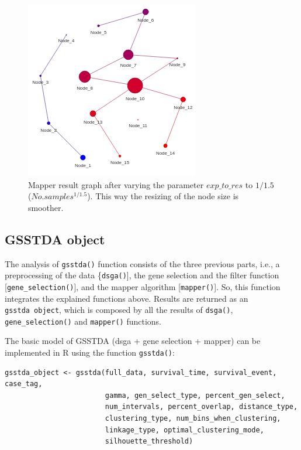 \begin{figure}
\includegraphics[width=0.65\linewidth,height=0.3\textheight]{Figures/plot_mapper_object_1_5} \caption{Mapper result graph after varying the parameter $exp\_to\_res$ to $1/1.5$ ($No. samples^{1/1.5}$). This way the resizing of the node size is smoother.}\label{fig:fig3}
\end{figure}

\hypertarget{section4.4}{%
\subsection{GSSTDA object}\label{section4.4}}

The analysis of \texttt{gsstda()} function consists of the three previous parts, i.e., a preprocessing of the data \{\texttt{dsga()}{]}, the gene selection and the filter function {[}\texttt{gene\_selection()}{]}, and the mapper algorithm {[}\texttt{mapper()}{]}. So, this function integrates the explained functions above. Results are returned as an \texttt{gsstda\ object}, which is composed by all the results of \texttt{dsga()}, \texttt{gene\_selection()} and \texttt{mapper()} functions.

The basic model of GSSTDA (dsga + gene selection + mapper) can be implemented in R using the function \texttt{gsstda()}:

\begin{verbatim}
gsstda_object <- gsstda(full_data, survival_time, survival_event, case_tag,
                        gamma, gen_select_type, percent_gen_select, 
                        num_intervals, percent_overlap, distance_type, 
                        clustering_type, num_bins_when_clustering, 
                        linkage_type, optimal_clustering_mode, 
                        silhouette_threshold)
\end{verbatim}

